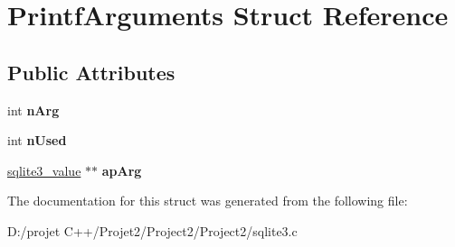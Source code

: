 \hypertarget{struct_printf_arguments}{}\section{Printf\+Arguments Struct Reference}
\label{struct_printf_arguments}
\subsection*{Public Attributes}
\begin{DoxyCompactItemize}
\item 
\mbox{\label{struct_printf_arguments_a8f4465ebae2de254882c3253f0f01993}} 
int {\bfseries n\+Arg}
\item 
\mbox{\label{struct_printf_arguments_a686ce8f8451154f2ffd7b91cd0908327}} 
int {\bfseries n\+Used}
\item 
\mbox{\label{struct_printf_arguments_a78d20f483184bdb3c0abdeca93f1dd2d}} 
\mbox{\hyperlink{structsqlite3__value}{sqlite3\+\_\+value}} $\ast$$\ast$ {\bfseries ap\+Arg}
\end{DoxyCompactItemize}


The documentation for this struct was generated from the following file\+:\begin{DoxyCompactItemize}
\item 
D\+:/projet C++/\+Projet2/\+Project2/\+Project2/sqlite3.\+c\end{DoxyCompactItemize}
